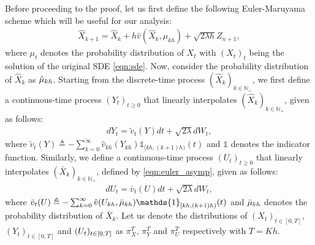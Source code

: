 Before proceeding to the proof, let us first define the following Euler-Maruyama scheme which will be useful for our analysis:
\begin{align}
\hat{X}_{k+1}  = \hat{X}_k + h \hat{v}(\hat{X}_k, \mu_{kh}) + \sqrt{2\lambda h}Z_{n+1},
\end{align}
where $\mu_t$ denotes the probability distribution of $X_t$ with $(X_t)_t$ being the solution of the original SDE \eqref{eqn:sde}. Now, consider the probability distribution of $\hat{X}_k$ as $\hat{\mu}_{kh}$.  Starting from the discrete-time process $(\hat{X}_k)_{k\in \mathbb{N}_+}$, we first define a continuous-time process $(Y_t)_{t\geq 0}$ that linearly interpolates $(\hat{X}_k)_{k\in \mathbb{N}_+}$, given as follows: 
\begin{align}
d Y_t = \tilde{v}_t(Y) dt + \sqrt{2 \lambda} dW_t, \label{eqn:sde_linear}
\end{align}
where $\tilde{v}_t(Y) \triangleq - \sum_{k=0}^{\infty} \hat{v}_{kh} (Y_{kh}) \mathds{1}_{[kh, (k+1)h)}(t)$ and $\mathds{1}$ denotes the indicator function.
Similarly, we define a continuous-time process $(U_t)_{t\geq 0}$ that linearly interpolates $(\bar{X}_k)_{k\in \mathbb{N}_+}$, defined by \eqref{eqn:euler_asymp}, given as follows: 
\begin{align}
d U_t = \bar{v}_t(U) dt + \sqrt{2 \lambda} dW_t, \label{eqn:sde_linear2}
\end{align}
where
$\bar{v}_t(U) \triangleq - \sum_{k=0}^{\infty} \hat{v} (U_{kh},
\mub_{kh}) \mathds{1}_{[kh, (k+1)h)}(t)$ and $\bar{\mu}_{kh}$ denotes the
probability distribution of $\bar{X}_k$.  Let us denote the
distributions of $(X_t)_{t \in [0,T]}$, $(Y_t)_{t \in [0,T]}$ and
$(U_t)_{t \in \left[0,T\right]}$ as $\pi_{X}^T$, $\pi_{Y}^T$ and $\pi_{U}^T$
respectively with $T = Kh$.
%


\newcommand{\minvsp}{0}

